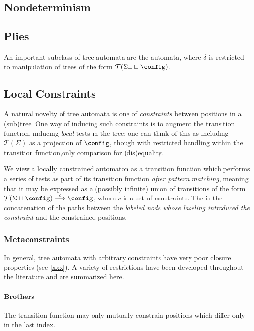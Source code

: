 \subsection{Nondeterminism}

\subsection{Plies}

An important subclass of tree automata are the  automata,
where $\delta$ is restricted to manipulation of trees of the form
$\mathcal{T}(\Sigma_+ \sqcup \config)$.

\subsection{Local Constraints}

A natural novelty of tree automata is one of {\em constraints} between
positions in a (sub)tree.  One way of inducing such constraints is to
augment the transition function, inducing {\em local} tests in the tree; one
can think of this as including $\mathcal{T}(\Sigma)$ as a projection of
$\config$, though with restricted handling within the transition
function,\eg only comparison for (dis)equality.

We view a locally constrained automaton as a transition function which
performs a series of tests as part of its transition function {\em after
pattern matching}, meaning that it may be expressed as a (possibly infinite)
union of transitions of the form $\mathcal{T}(\Sigma \sqcup \config)
\stackrel{c}{\longrightarrow} \config$, where $c$ is a set of constraints.
The  is the concatenation of the paths between the
{\em labeled node whose labeling introduced the constraint} and the
constrained positions.

\subsubsection{Metaconstraints}

In general, tree automata with arbitrary constraints have very poor closure
properties (see \autoref{xxx}).  A variety of restrictions have been
developed throughout the literature and are summarized here.

\paragraph{Brothers} The transition function may only mutually constrain
positions which differ only in the last index.

